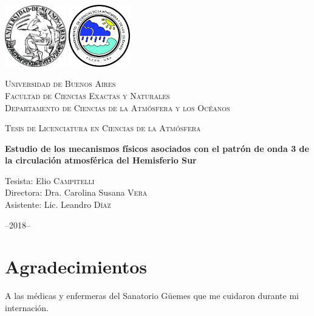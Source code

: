 \documentclass[spanish,a4paper,12pt,oneside]{book}
\title{}
\author{Elio Campitelli}
\date{}
\begin{document}
\frontmatter

\begin{titlepage}
    \centering
    \includegraphics[width=0.2\textwidth]{logoUBA}  \hfill \includegraphics[width=0.2\textwidth]{logoDCAO} \par
    \vspace{0.5cm}
    {\scshape\LARGE Universidad de Buenos Aires  \\
    \large Facultad de Ciencias Exactas y Naturales \\
Departamento de Ciencias de la Atmósfera y los Océanos  \par}
    \vspace{0.5cm}
    {\scshape\Large Tesis de Licenciatura en Ciencias de la Atmósfera\par}
    \vspace{1cm}
    {\huge\bfseries Estudio de los mecanismos físicos asociados con el patrón de onda 3 de la circulación atmosférica del Hemisferio Sur\par}
    \vspace{1.5cm}
    {\Large Tesista: Elio \textsc{Campitelli} \\
        Directora:  Dra. Carolina Susana \textsc{Vera} \\
        Asistente: Lic. Leandro \textsc{Díaz}
    \par}
    \vfill

    {\large --2018--\par}
\end{titlepage}

\chapter*{Agradecimientos}

A las médicas y enfermeras del Sanatorio Güemes que me cuidaron durante
mi internación.

\newpage
\end{document}
